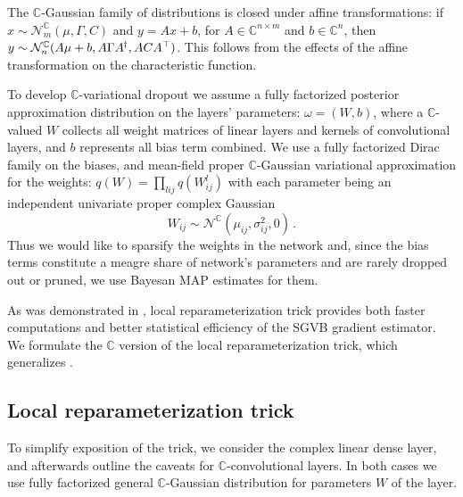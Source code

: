 \documentclass[a4paper,10pt]{article}
\newcommand{\cplx}{\mathbb{C}}
\newcommand{\hop}{{\mkern-1.5mu\dagger}}
\begin{document}
The $\cplx$-Gaussian family of distributions is closed under affine transformations:
if $
  x \sim \mathcal{N}_m^{\cplx}(\mu, \Gamma, C)
$ and $y = A x + b$, for $
  A \in \cplx^{n\times m}
$ and $b \in \cplx^{n}$, then $
  y \sim \mathcal{N}_n^{\cplx}(A\mu + b, A \Gamma A^\hop, A C A^\top)
$. This follows from the effects of the affine transformation on the characteristic
function.

To develop $\cplx$-variational dropout we assume a fully factorized posterior approximation
distribution on the layers' parameters: $\omega = (W, b)$, where a $\cplx$-valued $W$ collects
all weight matrices of linear layers and kernels of convolutional layers, and $b$ represents
all bias term combined. We use a fully factorized Dirac family on the biases, and mean-field
proper $\cplx$-Gaussian variational approximation for the weights: $
  q(W) = \prod_{lij} q(W^{l}_{ij})
$ with each parameter being an independent univariate proper complex Gaussian
\begin{equation} \label{eq:c-gauss-vi}
  W_{ij}
    \sim \mathcal{N}^{\cplx}(\mu_{ij}, \sigma^2_{ij}, 0)
  \,.
\end{equation}
Thus we would like to sparsify the weights in the network and, since the bias terms constitute
a meagre share of network's parameters and are rarely dropped out or pruned, we use Bayesan
MAP estimates for them.

As was demonstrated in \cite{kingma_variational_2015}, local reparameterization trick
provides both faster computations and better statistical efficiency of the SGVB gradient
estimator. We formulate the $\cplx$ version of the local reparameterization trick, which
generalizes \cite{wang_fast_2013}.


\subsection{Local reparameterization trick} %
\label{sub:local_reparameterization_trick}

To simplify exposition of the trick, we consider the complex linear dense layer, and afterwards
outline the caveats for $\cplx$-convolutional layers. In both cases we use fully factorized
general $\cplx$-Gaussian distribution for parameters $W$ of the layer.
\end{document}
